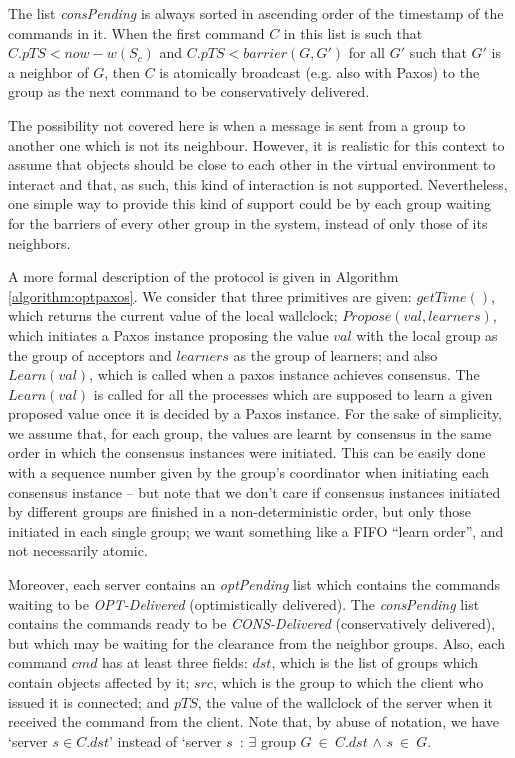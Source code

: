 \documentclass[times, 10pt]{article}
\begin{document}
The list \textit{consPending} is always sorted in ascending order of the timestamp of the commands in it. When the first command $C$ in this list is such that $C.pTS < now - w(S_c)$ and $C.pTS < barrier(G, G')$ for all $G'$ such that $G'$ is a neighbor of $G$, then $C$ is atomically broadcast (e.g. also with Paxos) to the group as the next command to be conservatively delivered. 

The possibility not covered here is when a message is sent from a group to another one which is not its neighbour. However, it is realistic for this context to assume that objects should be close to each other in the virtual environment to interact and that, as such, this kind of interaction is not supported. Nevertheless, one simple way to provide this kind of support could be by each group waiting for the barriers of every other group in the system, instead of only those of its neighbors.

A more formal description of the protocol is given in Algorithm \ref{algorithm:optpaxos}. We consider that three primitives are given: $getTime()$, which returns the current value of the local wallclock; $Propose(val, learners)$, which initiates a Paxos \cite{paxosref} instance proposing the value $val$ with the local group as the group of acceptors and $learners$ as the group of learners; and also $Learn(val)$, which is called when a paxos instance achieves consensus. The $Learn(val)$ is called for all the processes which are supposed to learn a given proposed value once it is decided by a Paxos instance. For the sake of simplicity, we assume that, for each group, the values are learnt by consensus in the same order in which the consensus instances were initiated. This can be easily done with a sequence number given by the group's coordinator when initiating each consensus instance -- but note that we don't care if consensus instances initiated by different groups are finished in a non-deterministic order, but only those initiated in each single group; we want something like a FIFO ``learn order'', and not necessarily atomic.

Moreover, each server contains an \textit{optPending} list which contains the commands waiting to be \textit{OPT-Delivered} (optimistically delivered). The \mbox{\textit{consPending}} list contains the commands ready to be \textit{CONS-Delivered} (conservatively delivered), but which may be waiting for the clearance from the neighbor groups. Also, each command $cmd$ has at least three fields: $dst$, which is the list of groups which contain objects affected by it; $src$, which is the group to which the client who issued it is connected; and $pTS$, the value of the wallclock of the server when it received the command from the client. Note that, by abuse of notation, we have `server $s \in C.dst$' instead of `server $s$~: $\exists$ group $G~\in~C.dst$ $\wedge$ $s~\in~G$.
\end{document}
